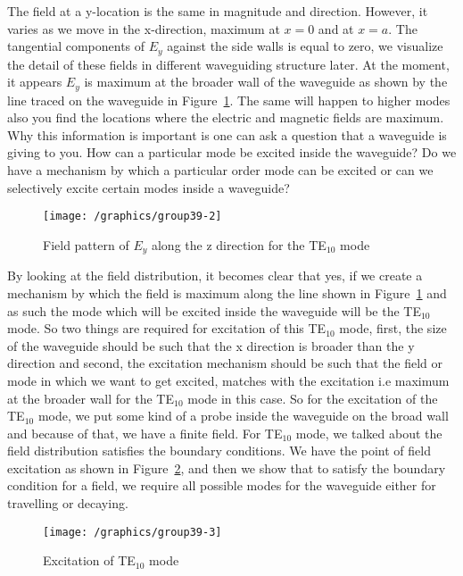The field at a y-location is the same in magnitude and direction. However, it varies as we move in the x-direction, maximum at $x = 0$ and at $x = a$. The tangential components of $E_y$ against the side walls is equal to zero, we visualize the detail of these fields in different waveguiding structure later. At the moment, it appears $E_y$ is maximum at the broader wall of the waveguide as shown by the line traced on the waveguide in Figure~\ref{fig:lec39-2}. The same will happen to higher modes also you find the locations where the electric and magnetic fields are maximum. Why this information is important is one can ask a question that a waveguide is giving to you. How can a particular mode be excited inside the waveguide? Do we have a mechanism by which a particular order mode can be excited or can we selectively excite certain modes inside a waveguide?
\begin{figure}[h]
\centering
\texttt{[image: /graphics/group39-2]}
\caption{Field pattern of $E_y$ along the z direction for the TE$_{10}$ mode}
\label{fig:lec39-2}
\end{figure}

By looking at the field distribution, it becomes clear that yes, if we create a mechanism by which the field is maximum along the line shown in Figure~\ref{fig:lec39-2} and as such the mode which will be excited inside the waveguide will be the TE$_{10}$ mode. So two things are required for excitation of this TE$_{10}$ mode, first, the size of the waveguide should be such that the x direction is broader than the y direction and second, the excitation mechanism should be such that the field or mode in which we want to get excited, matches with the excitation i.e maximum at the broader wall for the TE$_{10}$ mode in this case. So for the excitation of the TE$_{10}$ mode, we put some kind of a probe inside the waveguide on the broad wall and because of that, we have a finite field. For TE$_{10}$ mode, we talked about the field distribution satisfies the boundary conditions. We have the point of field excitation as shown in Figure~\ref{fig:lec39-3}, and then we show that to satisfy the boundary condition for a field, we require all possible modes for the waveguide either for travelling or decaying.
\begin{figure}[h]
\centering
\texttt{[image: /graphics/group39-3]}
\caption{Excitation of TE$_{10}$ mode}
\label{fig:lec39-3}
\end{figure}


